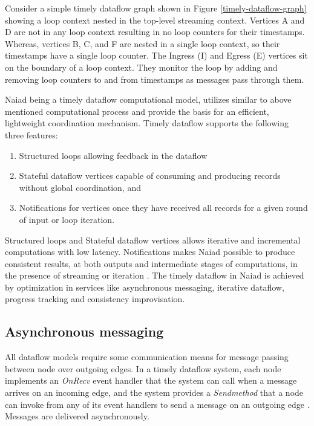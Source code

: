 \documentclass[9pt,twocolumn,twoside]{../../styles/osajnl}
\begin{document}
Consider a simple timely dataflow graph shown in Figure
\ref{timely-dataflow-graph} showing a loop context nested in the
top-level streaming context. Vertices A and D are not in any loop
context resulting in no loop counters for their timestamps. Whereas,
vertices B, C, and F are nested in a single loop context, so their
timestamps have a single loop counter. The Ingress (I) and Egress (E)
vertices sit on the boundary of a loop context. They monitor the loop
by adding and removing loop counters to and from timestamps as
messages pass through them.

Naiad being a timely dataflow computational model, utilizes similar to
above mentioned computational process and provide the basis for an
efficient, lightweight coordination mechanism. Timely dataflow
supports the following three features:

\begin{enumerate}
\item Structured loops allowing feedback in the dataflow
\item Stateful dataflow vertices capable of consuming and producing
  records without global coordination, and
\item Notifications for vertices once they have received all records
  for a given round of input or loop iteration.
\end{enumerate}

Structured loops and Stateful dataflow vertices allows iterative and
incremental computations with low latency. Notifications makes Naiad
possible to produce consistent results, at both outputs and
intermediate stages of computations, in the presence of streaming or
iteration \cite{paper1-Naiad}. The timely dataflow in Naiad is
achieved by optimization in services like asynchronous messaging,
iterative dataflow, progress tracking and consistency improvisation.

\subsection{Asynchronous messaging}
All dataflow models require some communication means for message
passing between node over outgoing edges. In a timely dataflow system,
each node implements an \textit{OnRecv} event handler that the system
can call when a message arrives on an incoming edge, and the system
provides a \textit{Sendmethod} that a node can invoke from any of its
event handlers to send a message on an outgoing edge
\cite{paper3-Naiad}. Messages are delivered asynchronously.
\end{document}
